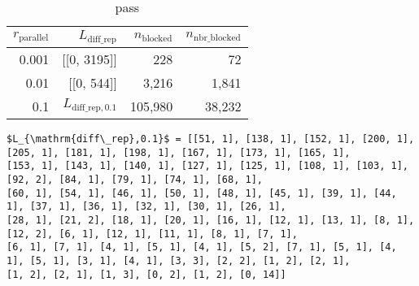 \documentclass[ijgi,article,submit,moreauthors,pdftex]{Definitions/mdpi}
\begin{document}
\begin{table}[tb]
\centering
\caption{pass}
\begin{tabular}{rrrr}
\hline
$r_\mathrm{parallel}$   & $L_\mathrm{diff\_rep}$        & $n_\mathrm{blocked}$  & $n_\mathrm{nbr\_blocked}$ \\ \hline
0.001                   & [[0, 3195]]                   &       228             &       72                  \\
0.01                    & [[0, 544]]                    &   3{,}216             &  1{,}841                  \\
0.1                     & $L_{\mathrm{diff\_rep}, 0.1}$ & 105{,}980             & 38{,}232                  \\ \hline 
\end{tabular}
\begin{Verbatim}[fontfamily=normal,commandchars=\\\{\},
codes={\catcode`$=3\catcode`^=7\catcode`_=8}]
$L_{\mathrm{diff\_rep},0.1}$ = [[51, 1], [138, 1], [152, 1], [200, 1], [205, 1], [181, 1], [198, 1], [167, 1], [173, 1], [165, 1], 
[153, 1], [143, 1], [140, 1], [127, 1], [125, 1], [108, 1], [103, 1], [92, 2], [84, 1], [79, 1], [74, 1], [68, 1], 
[60, 1], [54, 1], [46, 1], [50, 1], [48, 1], [45, 1], [39, 1], [44, 1], [37, 1], [36, 1], [32, 1], [30, 1], [26, 1], 
[28, 1], [21, 2], [18, 1], [20, 1], [16, 1], [12, 1], [13, 1], [8, 1], [12, 2], [6, 1], [12, 1], [11, 1], [8, 1], [7, 1], 
[6, 1], [7, 1], [4, 1], [5, 1], [4, 1], [5, 2], [7, 1], [5, 1], [4, 1], [5, 1], [3, 1], [4, 1], [3, 3], [2, 2], [1, 2], [2, 1], 
[1, 2], [2, 1], [1, 3], [0, 2], [1, 2], [0, 14]]
\end{Verbatim}
\label{tab:parallel_param_comparison}
\end{table}
\end{document}

